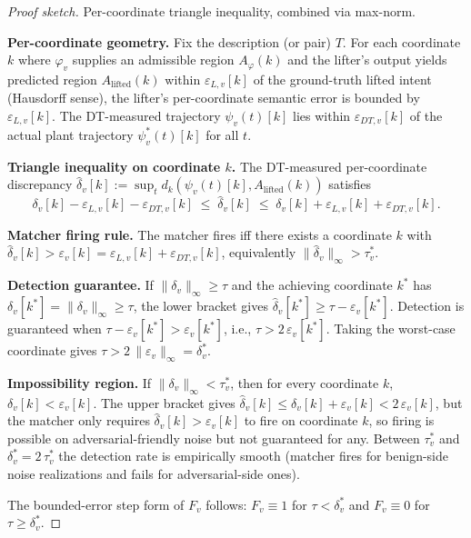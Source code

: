 \documentclass[11pt]{article}
\begin{document}
\begin{proof}[Proof sketch]
Per-coordinate triangle inequality, combined via max-norm.

\textbf{Per-coordinate geometry.} Fix the description (or pair) $T$. For each
coordinate $k$ where $\varphi_v$ supplies an admissible region $A_\varphi(k)$
and the lifter's output yields predicted region $A_{\text{lifted}}(k)$ within
$\varepsilon_{L,v}[k]$ of the ground-truth lifted intent (Hausdorff sense),
the lifter's per-coordinate semantic error is bounded by
$\varepsilon_{L,v}[k]$. The DT-measured trajectory $\psi_v(t)[k]$ lies within
$\varepsilon_{DT,v}[k]$ of the actual plant trajectory $\psi_v^{*}(t)[k]$
for all $t$.

\textbf{Triangle inequality on coordinate $k$.} The DT-measured per-coordinate
discrepancy $\hat{\delta}_v[k] := \sup_t d_k(\psi_v(t)[k], A_{\text{lifted}}(k))$
satisfies
\[
   \delta_v[k] - \varepsilon_{L,v}[k] - \varepsilon_{DT,v}[k]
\;\leq\;
   \hat{\delta}_v[k]
\;\leq\;
   \delta_v[k] + \varepsilon_{L,v}[k] + \varepsilon_{DT,v}[k].
\]

\textbf{Matcher firing rule.} The matcher fires iff there exists a
coordinate $k$ with $\hat{\delta}_v[k] > \varepsilon_v[k] =
\varepsilon_{L,v}[k] + \varepsilon_{DT,v}[k]$, equivalently
$\|\hat{\delta}_v\|_\infty > \tau^{*}_{v}$.

\textbf{Detection guarantee.} If $\|\delta_v\|_\infty \geq \tau$ and the
achieving coordinate $k^{*}$ has $\delta_v[k^{*}] = \|\delta_v\|_\infty
\geq \tau$, the lower bracket gives
$\hat{\delta}_v[k^{*}] \geq \tau - \varepsilon_v[k^{*}]$. Detection is
guaranteed when $\tau - \varepsilon_v[k^{*}] > \varepsilon_v[k^{*}]$, i.e.,
$\tau > 2\,\varepsilon_v[k^{*}]$. Taking the worst-case coordinate gives
$\tau > 2\,\|\varepsilon_v\|_\infty = \delta^{*}_{v}$.

\textbf{Impossibility region.} If $\|\delta_v\|_\infty < \tau^{*}_{v}$, then
for every coordinate $k$, $\delta_v[k] < \varepsilon_v[k]$. The upper
bracket gives $\hat{\delta}_v[k] \leq \delta_v[k] + \varepsilon_v[k] <
2\,\varepsilon_v[k]$, but the matcher only requires
$\hat{\delta}_v[k] > \varepsilon_v[k]$ to fire on coordinate $k$, so
firing is possible on adversarial-friendly noise but not guaranteed for
any. Between $\tau^{*}_{v}$ and $\delta^{*}_{v} = 2\,\tau^{*}_{v}$ the
detection rate is empirically smooth (matcher fires for benign-side noise
realizations and fails for adversarial-side ones).

The bounded-error step form of $F_v$ follows: $F_v \equiv 1$ for
$\tau < \delta^{*}_{v}$ and $F_v \equiv 0$ for $\tau \geq \delta^{*}_{v}$.
\end{proof}
\end{document}
